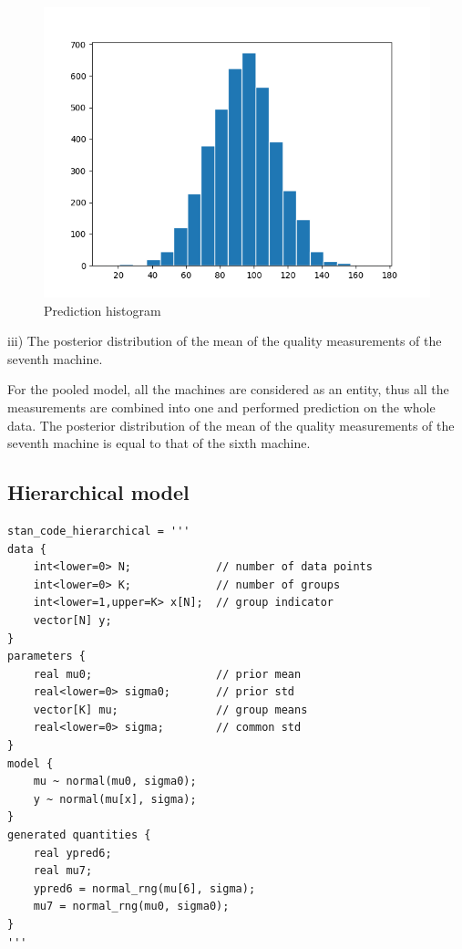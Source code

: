\documentclass{article}
\begin{document}
\begin{figure}[H]
\centering  
\includegraphics[scale=0.5]{pooled_hist.png}
\caption{Prediction histogram}
\label{fig: label}
\end{figure}

iii) The posterior distribution of the mean of the quality measurements of the seventh machine.

For the pooled model, all the machines are considered as an entity, thus all the measurements are combined into one and performed prediction on the whole data. The posterior distribution of the mean of the quality measurements of the seventh machine is equal to that of the sixth machine.


\subsection{Hierarchical model}

\begin{verbatim}  
stan_code_hierarchical = '''
data {
    int<lower=0> N;             // number of data points
    int<lower=0> K;             // number of groups
    int<lower=1,upper=K> x[N];  // group indicator
    vector[N] y;
}
parameters {
    real mu0;                   // prior mean
    real<lower=0> sigma0;       // prior std
    vector[K] mu;               // group means
    real<lower=0> sigma;        // common std
}
model {
    mu ~ normal(mu0, sigma0);
    y ~ normal(mu[x], sigma);
}
generated quantities {
    real ypred6;
    real mu7;
    ypred6 = normal_rng(mu[6], sigma);
    mu7 = normal_rng(mu0, sigma0);
}
'''
\end{verbatim}
\end{document}
